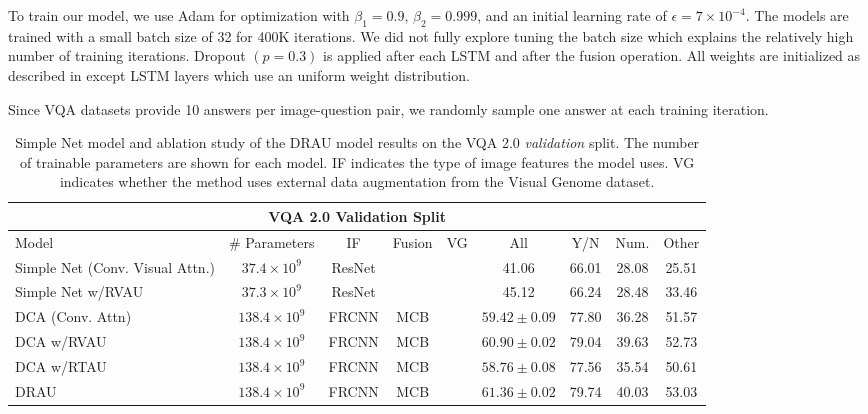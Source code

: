 \documentclass[times,twocolumn, final ,authoryear]{elsarticle}
\newcommand{\xmark}{\ding{55}}%
\begin{document}
To train our model, we use Adam \citep{kingma2014} for optimization with $\beta_1= 0.9 \text{, } \beta_2 = 0.999$, and  an initial learning rate of
$\epsilon= 7\times10^{-4}$. The models are trained with a small batch size of 32 for  400K iterations. We did not fully explore tuning the batch size which explains the relatively high number of training iterations.
Dropout $(p = 0.3)$ is applied after each LSTM and after the fusion operation. All weights are initialized as described in \citep{glorot2010} except LSTM layers which use an uniform weight distribution.

Since VQA datasets provide 10 answers per image-question pair, we randomly sample one answer at each training iteration.

\begin{table*}
	\center
	\caption{Simple Net model and ablation study  of the DRAU model results on the VQA 2.0 \textit{validation} split. The number of trainable parameters are shown for each model. IF indicates the type of image features the model uses. VG indicates whether the method uses external data augmentation from the Visual Genome dataset.}
	
		\begin{tabular}{lcccccccc}
			\toprule
			\multicolumn{9}{c}{VQA 2.0 Validation Split} \\
			\midrule
			Model                           & \# Parameters     & IF     & Fusion & VG         & All                & Y/N   & Num.  & Other \\
			\cmidrule(r){1-1}       \cmidrule(l){2-5}  \cmidrule(l){6-9}
			Simple Net (Conv. Visual Attn.) & $37.4\times 10^9$ & ResNet & \xmark & \checkmark & 41.06              & 66.01 & 28.08 & 25.51 \\ %
			Simple Net w/RVAU               & $37.3\times10^9$  & ResNet & \xmark & \checkmark & 45.12              & 66.24 & 28.48 & 33.46 \\
			\midrule	
			DCA (Conv. Attn)                & $138.4\times10^9$ & FRCNN  & MCB    & \xmark     & $59.42 \pm 0.09$   & 77.80 & 36.28 & 51.57 \\ %
			DCA w/RVAU                      & $138.4\times10^9$ & FRCNN  & MCB    & \xmark     & $60.90 \pm 0.02$   & 79.04 & 39.63 & 52.73 \\ %
			DCA w/RTAU                      & $138.4\times10^9$ & FRCNN  & MCB    & \xmark     & $ 58.76 \pm 0.08 $ & 77.56 & 35.54 & 50.61 \\
			DRAU                            & $138.4\times10^9$ & FRCNN  & MCB    & \xmark     & $61.36 \pm 0.02$   & 79.74 & 40.03 & 53.03 \\
			\bottomrule
		\end{tabular}
	
	\label{tab:vqa_dau_baselines}
\end{table*}
\end{document}
